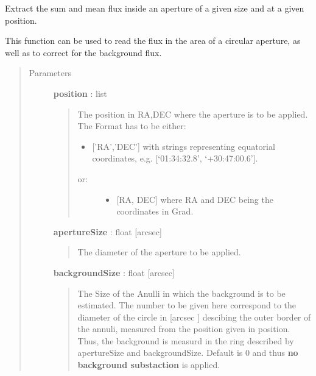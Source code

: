\documentclass[a4paper,10pt,english]{sphinxmanual}
\begin{document}
\begin{fulllineitems}
\begin{fulllineitems}
\label{maps:astrolyze.maps.fits.FitsMap.read_aperture}
Extract the sum and mean flux inside an aperture of a given size
and at a given position.

This function can be used to read the flux in the area of a circular
aperture, as well as to correct for the background flux.
\begin{quote}\begin{description}
\item[{Parameters }] \leavevmode
\textbf{position} : list
\begin{quote}

The position in RA,DEC where the aperture is to be applied.
The Format has to be either:
\begin{itemize}
\item {} 
{[}'RA','DEC'{]} with strings representing equatorial
coordinates, e.g. {[}`01:34:32.8', `+30:47:00.6'{]}.

\end{itemize}
\begin{description}
\item[{or:}] \leavevmode\begin{itemize}
\item {} 
{[}RA, DEC{]} where RA and DEC being the coordinates in Grad.

\end{itemize}

\end{description}
\end{quote}

\textbf{apertureSize} : float {[}arcsec{]}
\begin{quote}

The diameter of the aperture to be applied.
\end{quote}

\textbf{backgroundSize} : float {[}arcsec{]}
\begin{quote}

The Size of the Anulli in which the background is to be
estimated. The number to be given here correspond to the diameter
of the circle in {[}arcsec {]} descibing the outer border of the
annuli, measured from the position given in position. Thus, the
background is measurd in the ring described by apertureSize and
backgroundSize. Default is 0 and thus \textbf{no background substaction}
is applied.
\end{quote}


\end{description}
\end{quote}
\end{fulllineitems}
\end{fulllineitems}
\end{document}
